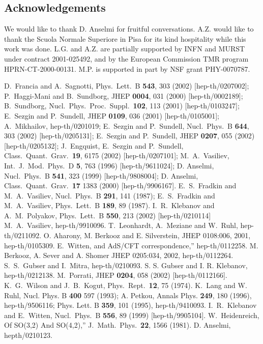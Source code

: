 \documentclass[a4paper,12pt]{article}
\begin{document}
\subsection*{Acknowledgements}
We would like to thank D. Anselmi for fruitful conversations.
A.Z. would like to thank the Scuola Normale Superiore in Pisa 
for its kind hospitality while this work was done.
L.G. and A.Z. are partially
supported by INFN and MURST under contract 2001-025492, and by 
 the European Commission TMR
program HPRN-CT-2000-00131.
M.P. is supported in part by NSF grant PHY-0070787. 




\begin{thebibliography}{9}
D.~Francia and A.~Sagnotti,
Phys.\ Lett.\ B {\bf 543}, 303 (2002)
[hep-th/0207002];
P.~Haggi-Mani and B.~Sundborg,
JHEP {\bf 0004}, 031 (2000)
[hep-th/0002189]; 
B.~Sundborg,
Nucl.\ Phys.\ Proc.\ Suppl.\  {\bf 102}, 113 (2001)
[hep-th/0103247];
E.~Sezgin and P.~Sundell,
JHEP {\bf 0109}, 036 (2001)
[hep-th/0105001];
A.~Mikhailov,
hep-th/0201019;
E.~Sezgin and P.~Sundell,
Nucl.\ Phys.\ B {\bf 644}, 303 (2002) [hep-th/0205131]; E.~Sezgin and
P.~Sundell, JHEP {\bf 0207}, 055 (2002) [hep-th/0205132]; J.~Engquist,
E.~Sezgin and P.~Sundell,
Class.\ Quant.\ Grav.\  {\bf 19}, 6175 (2002)
[hep-th/0207101];
M.~A.~Vasiliev,
Int.\ J.\ Mod.\ Phys.\ D {\bf 5}, 763 (1996) [hep-th/9611024];
D. Anselmi, Nucl.\ Phys.\ B {\bf 541}, 323 (1999) [hep-th/9808004];
D. Anselmi, Class.\ Quant.\ Grav.\ {\bf 17} 1383 (2000)
[hep-th/9906167].
 E.~S.~Fradkin and M.~A.~Vasiliev,
Nucl.\ Phys.\ B {\bf 291}, 141 (1987); E.~S.~Fradkin and
M.~A.~Vasiliev,
Phys.\ Lett.\ B {\bf 189}, 89 (1987).
 I.~R.~Klebanov and A.~M.~Polyakov,
Phys.\ Lett.\ B {\bf 550}, 213 (2002)
[hep-th/0210114]
 M.~A.~Vasiliev,
hep-th/9910096.
 T.~Leonhardt, A.~Meziane and W.~Ruhl, hep-th/0211092. 
 O. Aharony, M. Berkooz and E. Silverstein,
JHEP 0108:006, 2001, hep-th/0105309.
 E.~Witten,
and AdS/CFT correspondence,''
hep-th/0112258.
 M. Berkooz, A. Sever and  A. Shomer 
JHEP 0205:034, 2002, hep-th/0112264.  
 S.~S.~Gubser and I.~Mitra,
hep-th/0210093.
  S. S. Gubser and I. R. Klebanov, hep-th/0212138.
 M.~Porrati,
JHEP {\bf 0204}, 058 (2002)
[hep-th/0112166].
 K.~G.~Wilson and J.~B.~Kogut,
Phys.\ Rept.\  {\bf 12}, 75 (1974). 
 K.~Lang and W.~ Ruhl, 
Nucl. Phys. B {\bf 400} 597 (1993); A. Petkou, 
Annals  Phys. {\bf 249}, 180
(1996), hep-th/9506116; Phys. Lett. B {\bf 359}, 101 (1995), 
hep-th/9410093.
 I.~R.~Klebanov and E.~Witten,
Nucl.\ Phys.\ B {\bf 556}, 89 (1999)
[hep-th/9905104].
 W.~Heidenreich,
Of SO(3,2) And SO(4,2),''
J.\ Math.\ Phys.\  {\bf 22}, 1566 (1981).
 D. Anselmi, hepth/0210123.
\end{thebibliography}
\end{document}
